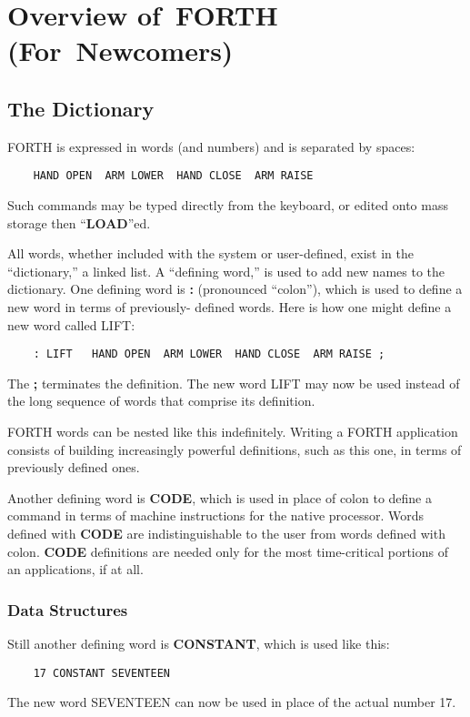 \appendix{}
\chapter{
Overview
of~FORTH
(For~Newcomers)}
\section{The Dictionary}
FORTH is expressed in words (and numbers) and is separated by spaces:
\begin{verbatim}
    HAND OPEN  ARM LOWER  HAND CLOSE  ARM RAISE 
\end{verbatim}
Such commands may be typed directly from the keyboard, or edited onto 
mass storage then ``{\bf LOAD}''ed.

All words, whether included with the system or user-defined,
exist in the ``dictionary,'' a linked list.  A ``defining word,'' is used to add
new names to the dictionary.  One defining word is {\bf :} (pronounced
``colon''), which is used to define a new word in terms of previously-
defined words.  Here is how one might define a new word called LIFT:
\begin{verbatim}
    : LIFT   HAND OPEN  ARM LOWER  HAND CLOSE  ARM RAISE ;
\end{verbatim}
The {\bf ;} terminates the definition.  The new word LIFT may now be used
instead of the long sequence of words that comprise its definition.

FORTH words can be nested like this indefinitely.  Writing a 
FORTH application consists of building increasingly powerful definitions,
such as this one, in terms of previously defined ones.

Another defining word is {\bf CODE}, which is used in place of colon to
define a command in terms of machine instructions for the native processor.
Words defined with {\bf CODE} are indistinguishable to the user from 
words defined with colon.  {\bf CODE} definitions are needed only for the most
time-critical portions of an applications, if at all.
\subsection{Data Structures}
Still another defining word is {\bf CONSTANT}, which is used like this:
\begin{verbatim}
    17 CONSTANT SEVENTEEN
\end{verbatim}
The new word SEVENTEEN can now be used in place of the actual number 17.

